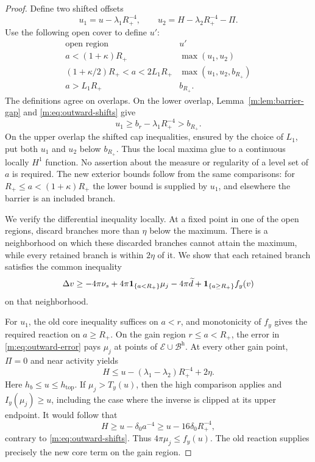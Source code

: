 \begin{proof}
Define two shifted offsets
\[
 u_1=u-\lambda_1R_+^{-4},\qquad
 u_2=H-\lambda_2R_+^{-4}-\Pi.
\]
Use the following open cover to define $u'$:
\begin{equation}
\label{m:eq:outward-branches}
\begin{array}{c|c}
 \text{open region}&u'\\ \hline
 a<(1+\kappa)R_+&\max(u_1,u_2)\\
 (1+\kappa/2)R_+<a<2L_1R_+&\max(u_1,u_2,b_{R_+})\\
 a>L_1R_+&b_{R_+}.
\end{array}
\end{equation}
The definitions agree on overlaps.  On the lower overlap,
Lemma~\ref{m:lem:barrier-gap} and \eqref{m:eq:outward-shifts} give
\[
 u_1\ge b_r-\lambda_1R_+^{-4}>b_{R_+}.
\]
On the upper overlap the shifted cap inequalities, ensured by the choice of
$L_1$, put both $u_1$ and $u_2$ below $b_{R_+}$.  Thus the local maxima glue
to a continuous locally $H^1$ function.  No assertion about the measure or
regularity of a level set of $a$ is required.  The new exterior bounds follow
from the same comparisons: for $R_+\le a<(1+\kappa)R_+$ the lower bound is
supplied by $u_1$, and elsewhere the barrier is an included branch.

We verify the differential inequality locally.  At a fixed point in one of
the open regions, discard branches more than $\eta$ below the maximum.
There is a neighborhood on which these discarded branches cannot attain
the maximum, while every retained branch is within $2\eta$ of it.  We show
that each retained branch satisfies the common inequality
\begin{equation}
\label{m:eq:outward-common}
 \Delta v\ge -4\pi\nu_s+4\pi\mathbf 1_{\{a<R_+\}}\mu_j
             -4\pi\widetilde d+\mathbf 1_{\{a\ge R_+\}}f_y(v)
\end{equation}
on that neighborhood.

For $u_1$, the old core inequality suffices on $a<r$, and monotonicity of
$f_y$ gives the required reaction on $a\ge R_+$.  On the gain region
$r\le a<R_+$, the error in \eqref{m:eq:outward-error} pays $\mu_j$ at points
of $\mathcal E\cup\mathcal B^{\mathrm h}$.  At every other gain point,
$\Pi=0$ and near activity yields
\[
 H\le u-(\lambda_1-\lambda_2)R_+^{-4}+2\eta.
\]
Here $h_b\le u\le h_{\mathrm{top}}$.  If $\mu_j>T_y(u)$, then the high
comparison applies and $I_y(\mu_j)\ge u$, including the case where the
inverse is clipped at its upper endpoint.  It would follow that
\[
 H\ge u-\delta_0a^{-4}\ge u-16\delta_0R_+^{-4},
\]
contrary to \eqref{m:eq:outward-shifts}.  Thus $4\pi\mu_j\le f_y(u)$.
The old reaction supplies precisely the new core term on the gain region.


\end{proof}
